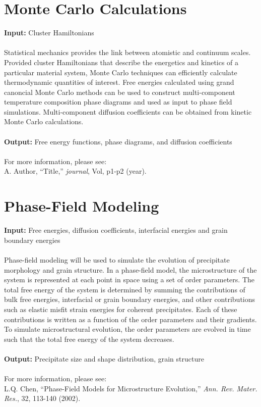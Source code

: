 \documentclass[12pt]{article}
\begin{document}
\section{Monte Carlo Calculations}
 \textbf{Input:}  Cluster Hamiltonians \\
 \\
Statistical mechanics provides the link between atomistic and continuum scales. Provided cluster Hamiltonians that describe the energetics and kinetics of a particular material system, Monte Carlo techniques can efficiently calculate thermodynamic quantities of interest. Free energies calculated using grand canoncial Monte Carlo methods can be used to construct multi-component temperature composition phase diagrams and used as input to phase field simulations. Multi-component diffusion coefficients can be obtained from kinetic Monte Carlo calculations.\\
\\
\textbf{Output:} Free energy functions, phase diagrams, and diffusion coefficients \\
\\
For more information, please see:
\\
A. Author, ``Title,'' \textit{journal}, Vol, p1-p2 (year).


 \section{Phase-Field Modeling}
 \textbf{Input:}  Free energies, diffusion coefficients, interfacial energies and grain boundary energies\\
 \\
Phase-field modeling will be used to simulate the evolution of precipitate morphology and grain structure. In a phase-field model, the microstructure of the system is represented at each point in space using a set of order parameters. The total free energy of the system is determined by summing the contributions of bulk free energies, interfacial or grain boundary energies, and other contributions such as elastic misfit strain energies for coherent precipitates. Each of these contributions is written as a function of the order parameters and their gradients. To simulate microstructural evolution, the order parameters are evolved in time such that the total free energy of the system decreases. \\
\\
\textbf{Output:} Precipitate size and shape distribution, grain structure \\
\\
For more information, please see:
\\
L.Q. Chen, ``Phase-Field Models for Microstructure Evolution,'' \textit{Ann. Rev. Mater. Res.}, 32, 113-140 (2002).
\end{document}
